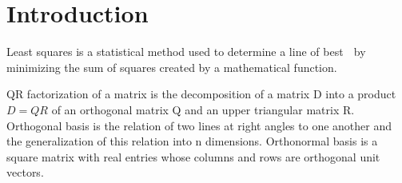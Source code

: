 \documentclass[12pt]{article}
\begin{document}
\author{BAMUZIBIRE SOLOMON MUKISA 14/U/3938/PS\\}
	\section{Introduction }
	Least  squares is a statistical method used to determine a line of best 
	by minimizing the sum of squares created by a mathematical function. 
	
	QR factorization of a matrix is the decomposition of a matrix D into a product 
	$D=QR$ of an orthogonal matrix Q and an upper triangular matrix R. Orthogonal basis is the relation of two lines at right angles to one another and the generalization of this relation into n dimensions. Orthonormal basis is a square matrix with real entries whose columns and rows are orthogonal unit vectors. 
	
\end{document}
